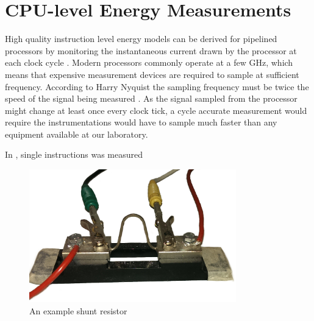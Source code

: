 \section{CPU-level Energy Measurements}

High quality instruction level energy models can be derived for pipelined
processors by monitoring the instantaneous current drawn by the processor at
each clock cycle \cite{nikolaidis2005instruction}. Modern processors commonly
operate at a few GHz, which means that expensive measurement devices are
required to sample at sufficient frequency. According to Harry Nyquist the
sampling frequency must be twice the speed of the signal being measured
\cite{nyquist1928certain}. As the signal sampled from the processor might
change at least once every clock tick, a cycle accurate measurement would
require the instrumentations would have to sample much faster than any equipment
available at our laboratory.

In \cite{rundehvatum2013exploring}, single instructions was measured 




\begin{figure}
    \centering
    \includegraphics[width=0.8\textwidth]{figs/shunt.jpg}
    \caption{An example shunt resistor}
    \label{fig:shunt}
\end{figure}


